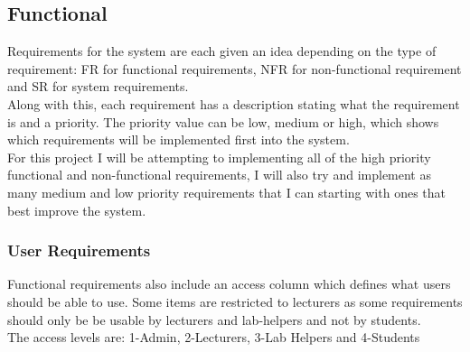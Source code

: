 \documentclass[12pt]{article}  %
\begin{document}
\subsection{Functional}
Requirements for the system are each given an idea depending on the type of requirement: FR for functional requirements, NFR for non-functional requirement and SR for system requirements.\\
Along with this, each requirement has a description stating what the requirement is and a priority. The priority value can be low, medium or high, which shows which requirements will be implemented first into the system.\\
For this project I will be attempting to implementing all of the high priority functional and non-functional requirements, I will also try and implement as many medium and low priority requirements that I can starting with ones that best improve the system. 


\def\arraystretch{1.5}
\subsubsection{User Requirements}
Functional requirements also include an access column which defines what users should be able to use. Some items are restricted to lecturers as some requirements should only be be usable by lecturers and lab-helpers and not by students.\\
The access levels are: 1-Admin, 2-Lecturers, 3-Lab Helpers and 4-Students
\end{document}
